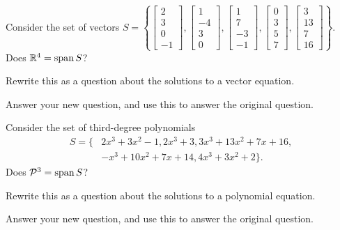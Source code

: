\begin{activity}{5}
  Consider the set of vectors \(S=\left\{
  \begin{bmatrix}2\\3\\0\\-1\end{bmatrix},
  \begin{bmatrix}1\\-4\\3\\0\end{bmatrix},
  \begin{bmatrix}1\\7\\-3\\-1\end{bmatrix},
  \begin{bmatrix}0\\3\\5\\7\end{bmatrix},
  \begin{bmatrix}3\\13\\7\\16\end{bmatrix}
  \right\}
  \).
  Does
  \(\mathbb{R}^4=\operatorname{span} S\)?
	\begin{subactivity}Rewrite this as a question about the solutions to a vector equation.
	\end{subactivity}
	\begin{subactivity}Answer your new question, and use this to answer the original question.
	\end{subactivity}
\end{activity}

\begin{activity}{10}
  Consider the set of third-degree polynomials 
  \begin{align*}
  S=\{
  &2x^3+3x^2-1,
  2x^3+3,
  3x^3+13x^2+7x+16, \\
  &-x^3+10x^2+7x+14,
  4x^3+3x^2+2 \} .
  \end{align*}
  Does
  \(\mathcal{P}^3=\operatorname{span} S\)?
	\begin{subactivity}Rewrite this as a question about the solutions to a polynomial equation.
	\end{subactivity}
	\begin{subactivity}Answer your new question, and use this to answer the original question.
	\end{subactivity}
\end{activity}

